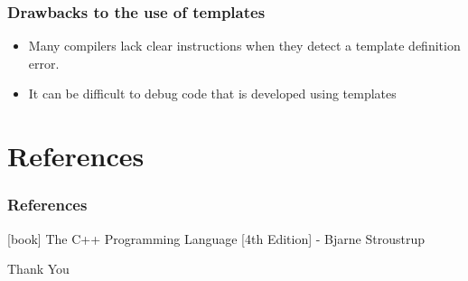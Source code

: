 \documentclass{beamer}
\begin{document}
\begin{frame}
\frametitle{Drawbacks to the use of templates}
\begin{itemize}
\item Many compilers lack clear instructions when they detect a template definition error.
\item It can be difficult to debug code that is developed using templates
\end{itemize}

\end{frame}


\section{References}
\begin{frame}
\frametitle{References}
\begin{thebibliography}{2} %
[book]
 The C++ Programming Language [4th Edition] - Bjarne Stroustrup
\end{thebibliography}
\end{frame}


\begin{frame}
\Huge{\centerline{Thank You}}
\end{frame}





\end{document}
